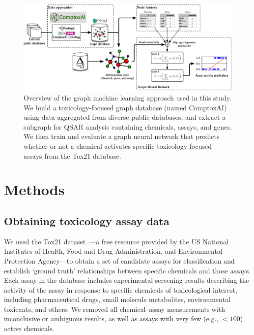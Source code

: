 \documentclass{ws-procs11x85}
\begin{document}
\begin{figure}
   \centering
   \includegraphics[width=\textwidth]{figures/figure1.pdf}
   \caption{Overview of the graph machine learning approach used in this study. We build a toxicology-focused graph database (named ComptoxAI) using data aggregated from diverse public databases, and extract a subgraph for QSAR analysis containing chemicals, assays, and genes. We then train and evaluate a graph neural network that predicts whether or not a chemical activates specific toxicology-focused assays from the Tox21 database.}
\end{figure}

\section{Methods}

\subsection{Obtaining toxicology assay data}
We used the Tox21 dataset~\cite{tice2013improving}---a free resource provided by the US National Institutes of Health, Food and Drug Administration, and Environmental Protection Agency---to obtain a set of candidate assays for classification and establish `ground truth' relationships between specific chemicals and those assays.
Each assay in the database includes experimental screening results describing the activity of the assay in response to specific chemicals of toxicological interest, including pharmaceutical drugs, small molecule metabolites, environmental toxicants, and others.
We removed all chemical--assay measurements with inconclusive or ambiguous results, as well as assays with very few (e.g., $<100$) active chemicals.
\end{document}
